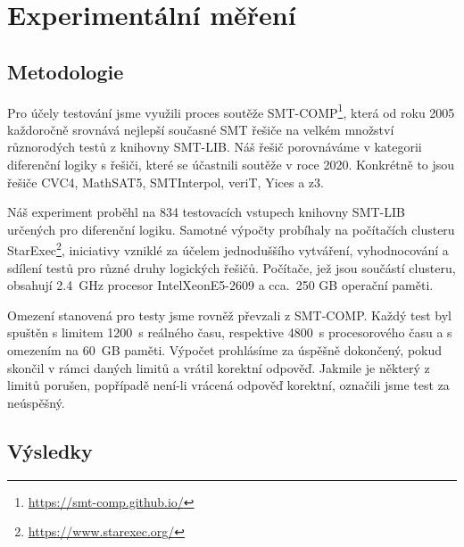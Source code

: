 \chapter{Experimentální měření}

\section{Metodologie}

Pro účely testování jsme využili proces soutěže SMT-COMP\footnote{\url{https://smt-comp.github.io/}}, která od roku 2005 každoročně srovnává nejlepší současné SMT řešiče na velkém množství různorodých testů z knihovny SMT-LIB. Náš řešič porovnáváme v kategorii diferenční logiky s řešiči, které se účastnili soutěže v roce 2020. Konkrétně to jsou řešiče CVC4, MathSAT5, SMTInterpol, veriT, Yices a z3.

Náš experiment proběhl na 834 testovacích vstupech knihovny SMT-LIB určených pro diferenční logiku. Samotné výpočty probíhaly na počítačích clusteru StarExec\footnote{\url{https://www.starexec.org/}}, iniciativy vzniklé za účelem jednoduššího vytváření, vyhodnocování a sdílení testů pro různé druhy logických řešičů. Počítače, jež jsou součástí clusteru, obsahují 2.4~GHz procesor Intel\textregistered Xeon\textregistered E5-2609 a cca.~250 GB operační paměti.

Omezení stanovená pro testy jsme rovněž převzali z SMT-COMP. Každý test byl spuštěn s limitem 1200~s reálného času, respektive 4800~s procesorového času a s omezením na 60~GB paměti. Výpočet prohlásíme za úspěšně dokončený, pokud skončil v rámci daných limitů a vrátil korektní odpověď. Jakmile je některý z limitů porušen, popřípadě není-li vrácená odpověď korektní, označili jsme test za neúspěšný. 

\section{Výsledky}

